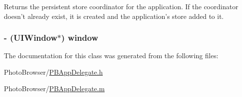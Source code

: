 Returns the persistent store coordinator for the application. If the coordinator doesn't already exist, it is created and the application's store added to it. \hypertarget{interface_p_b_app_delegate_ae04748cdefebda525b266731b6c120a2}{
\subsubsection[{window}]{\setlength{\rightskip}{0pt plus 5cm}-\/ (UIWindow$\ast$) window}}
\label{interface_p_b_app_delegate_ae04748cdefebda525b266731b6c120a2}


The documentation for this class was generated from the following files:\begin{DoxyCompactItemize}
\item 
PhotoBrowser/\hyperlink{_p_b_app_delegate_8h}{PBAppDelegate.h}\item 
PhotoBrowser/\hyperlink{_p_b_app_delegate_8m}{PBAppDelegate.m}\end{DoxyCompactItemize}
